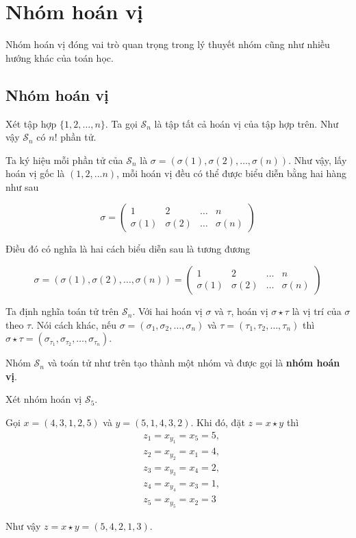 \chapter{Nhóm hoán vị}

Nhóm hoán vị đóng vai trò quan trọng trong lý thuyết nhóm cũng như nhiều hướng
khác của toán học.

\section{Nhóm hoán vị}

Xét tập hợp $\{ 1, 2, \ldots, n \}$. Ta gọi $\mathcal{S}_n$ là tập tất cả hoán vị 
của tập hợp trên. Như vậy $\mathcal{S}_n$ có $n!$ phần tử.

Ta ký hiệu mỗi phần tử của $\mathcal{S}_n$ là $\sigma =
(\sigma(1), \sigma(2), \ldots, \sigma(n))$. Như vậy, lấy hoán vị gốc là $(1, 2, 
\ldots n)$, mỗi hoán vị đều có thể được biểu diễn bằng hai hàng như sau

\begin{equation}
    \sigma = \begin{pmatrix}
        1 & 2 & \ldots & n \\
        \sigma(1) & \sigma(2) & \ldots & \sigma(n)
    \end{pmatrix}
\end{equation}

Điều đó có nghĩa là hai cách biểu diễn sau là tương đương

\begin{equation}
    \sigma = (\sigma(1), \sigma(2), \ldots, \sigma(n))
    = \begin{pmatrix}
        1 & 2 & \ldots & n \\
        \sigma(1) & \sigma(2) & \ldots & \sigma(n)
    \end{pmatrix}
\end{equation}

Ta định nghĩa toán tử trên $\mathcal{S}_n$. Với hai hoán vị $\sigma$ và $\tau$,
hoán vị $\sigma \star \tau$ là vị trí của $\sigma$ theo $\tau$. Nói cách
khác, nếu $\sigma = (\sigma_1, \sigma_2, \ldots, \sigma_n)$ và 
$\tau = (\tau_1, \tau_2, \ldots, \tau_n)$ thì $\sigma \star \tau =
(\sigma_{\tau_1}, \sigma_{\tau_2}, \ldots, \sigma_{\tau_n})$.

Nhóm $\mathcal{S}_n$ và toán tử như trên tạo thành một nhóm và được gọi là
\textbf{nhóm hoán vị}.

\begin{example}
    Xét nhóm hoán vị $\mathcal{S}_5$. 
    
    Gọi $x = (4, 3, 1, 2, 5)$ và
    $y = (5, 1, 4, 3, 2)$. Khi đó, đặt $z = x \star y$ thì
    \begin{align*}
        & z_1 = x_{y_1} = x_5 = 5, \\
        & z_2 = x_{y_2} = x_1 = 4, \\
        & z_3 = x_{y_3} = x_4 = 2, \\
        & z_4 = x_{y_4} = x_3 = 1, \\ 
        & z_5 = x_{y_5} = x_2 = 3
    \end{align*}

    Như vậy $z = x \star y = (5, 4, 2, 1, 3)$.
\end{example}

